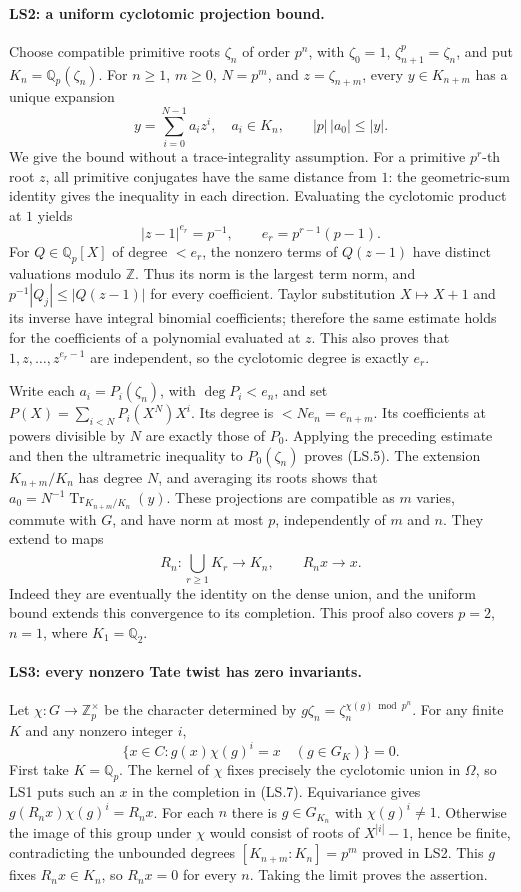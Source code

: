 \paragraph{LS2: a uniform cyclotomic projection bound.}
Choose compatible primitive roots $\zeta_n$ of order $p^n$, with
$\zeta_0=1$, $\zeta_{n+1}^p=\zeta_n$, and put
$K_n=\mathbb Q_p(\zeta_n)$. For $n\ge1$, $m\ge0$, $N=p^m$, and
$z=\zeta_{n+m}$, every $y\in K_{n+m}$ has a unique expansion
\[
 y=\sum_{i=0}^{N-1}a_i z^i,\quad a_i\in K_n,
 \qquad |p|\,|a_0|\le |y|.                         \tag{LS.5}
\]
We give the bound without a trace-integrality assumption. For a
primitive $p^r$-th root $z$, all primitive conjugates have the same
distance from $1$: the geometric-sum identity gives the inequality
in each direction. Evaluating the cyclotomic product at $1$ yields
\[
              |z-1|^{e_r}=p^{-1},\qquad
              e_r=p^{r-1}(p-1).                    \tag{LS.6}
\]
For $Q\in\mathbb Q_p[X]$ of degree $<e_r$, the nonzero terms of
$Q(z-1)$ have distinct valuations modulo $\mathbb Z$. Thus its norm
is the largest term norm, and
$p^{-1}|Q_j|\le|Q(z-1)|$ for every coefficient. Taylor substitution
$X\mapsto X+1$ and its inverse have integral binomial coefficients;
therefore the same estimate holds for the coefficients of a
polynomial evaluated at $z$. This also proves that
$1,z,\ldots,z^{e_r-1}$ are independent, so the cyclotomic degree is
exactly $e_r$.

Write each $a_i=P_i(\zeta_n)$, with $\deg P_i<e_n$, and set
$P(X)=\sum_{i<N}P_i(X^N)X^i$. Its degree is $<Ne_n=e_{n+m}$.
Its coefficients at powers divisible by $N$ are exactly those of
$P_0$. Applying the preceding estimate and then the ultrametric
inequality to $P_0(\zeta_n)$ proves (LS.5).
The extension $K_{n+m}/K_n$ has degree $N$, and averaging its roots
shows that $a_0=N^{-1}\operatorname{Tr}_{K_{n+m}/K_n}(y)$.
These projections are compatible as $m$ varies, commute with $G$,
and have norm at most $p$, independently of $m$ and $n$.
They extend to maps
\[
 R_n:\widehat{\bigcup_{r\ge1}K_r}\longrightarrow K_n,
 \qquad R_nx\longrightarrow x.                    \tag{LS.7}
\]
Indeed they are eventually the identity on the dense union, and the
uniform bound extends this convergence to its completion. This proof
also covers $p=2$, $n=1$, where $K_1=\mathbb Q_2$.

\paragraph{LS3: every nonzero Tate twist has zero invariants.}
Let $\chi:G\to\mathbb Z_p^\times$ be the character determined by
$g\zeta_n=\zeta_n^{\chi(g)\bmod p^n}$. For any finite $K$ and any
nonzero integer $i$,
\[
 \bigl\{x\in C:g(x)\chi(g)^i=x\quad(g\in G_K)\bigr\}=0.
 \tag{LS.8}
\]
First take $K=\mathbb Q_p$. The kernel of $\chi$ fixes precisely
the cyclotomic union in $\Omega$, so LS1 puts such an $x$ in the
completion in (LS.7). Equivariance gives
$g(R_nx)\chi(g)^i=R_nx$. For each $n$ there is
$g\in G_{K_n}$ with $\chi(g)^i\ne1$. Otherwise the image of this
group under $\chi$ would consist of roots of $X^{|i|}-1$, hence be
finite, contradicting the unbounded degrees
$[K_{n+m}:K_n]=p^m$ proved in LS2. This $g$ fixes $R_nx\in K_n$,
so $R_nx=0$ for every $n$. Taking the limit proves the assertion.

